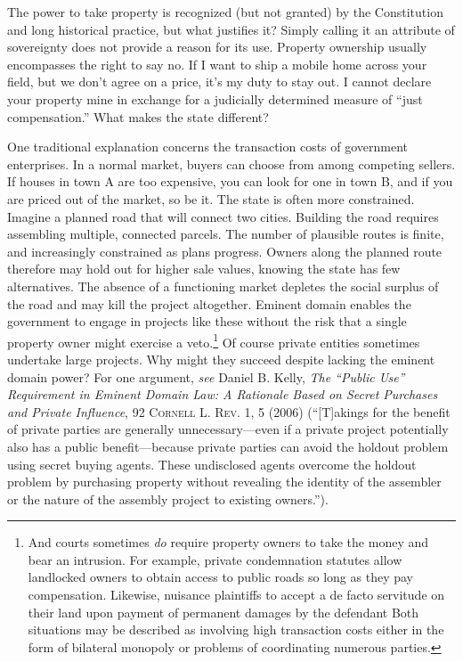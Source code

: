The power to take property is recognized (but not granted) by the Constitution
and long historical practice, but what justifies it? Simply calling it an
attribute of sovereignty does not provide a reason for its use. Property
ownership usually encompasses the right to say no. If I want to ship a mobile
home across your field, but we don't agree on a price, it's my duty to stay out.
I cannot declare your property mine in exchange for a judicially determined
measure of ``just compensation.'' What makes the state different?

One traditional explanation concerns the transaction costs of government
enterprises. In a normal market, buyers can choose from among competing sellers.
If houses in town A are too expensive, you can look for one in town B, and if
you are priced out of the market, so be it. The state is often more constrained.
Imagine a planned road that will connect two cities. Building the road requires
assembling multiple, connected parcels. The number of plausible routes is
finite, and increasingly constrained as plans progress. Owners along the planned
route therefore may hold out for higher sale values, knowing the state has few
alternatives. The absence of a functioning market depletes the social surplus of
the road and may kill the project altogether. Eminent domain enables the
government to engage in projects like these without the risk that a single
property owner might exercise a veto.\footnote{And courts sometimes \textit{do}
require property owners to take the money and bear an intrusion. For example,
private condemnation statutes allow landlocked owners to obtain access to public
roads so long as they pay compensation. Likewise,
 nuisance plaintiffs to accept a de facto servitude on their land upon
payment of permanent damages by the defendant Both situations may
be described as involving high transaction costs either in the form of bilateral
monopoly or problems of coordinating numerous parties.} Of course private
entities sometimes undertake large projects. Why might they succeed despite
lacking the eminent domain power? For one argument, \textit{see} Daniel B.
Kelly, \textit{The ``Public Use'' Requirement in Eminent Domain Law: A Rationale
Based on Secret Purchases and Private Influence}, 92 \textsc{Cornell L. Rev}. 1,
5 (2006) (``[T]akings for the benefit of private parties are generally
unnecessary---even if a private project potentially also has a public
benefit---because private parties can avoid the holdout problem using secret
buying agents. These undisclosed agents overcome the holdout problem by
purchasing property without revealing the identity of the assembler or the
nature of the assembly project to existing owners.'').

